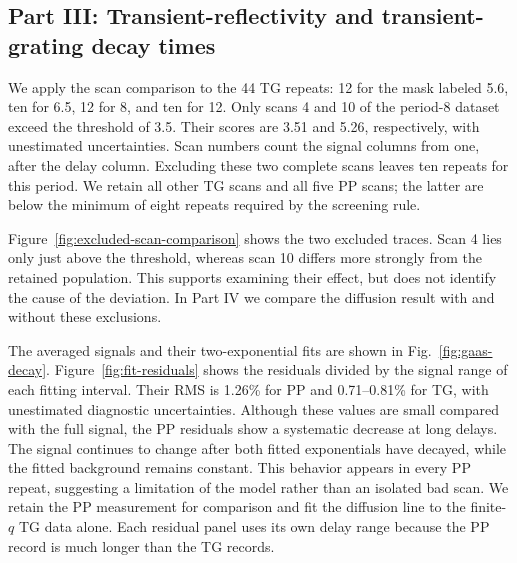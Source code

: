 \documentclass[11pt,a4paper]{article}
\begin{document}
\subsection{Part III: Transient-reflectivity and transient-grating decay times}\label{sec:decay-results}
We apply the scan comparison to the 44 TG repeats: 12 for the mask labeled 5.6, ten for 6.5, 12 for 8, and ten for 12. Only scans 4 and 10 of the period-8 dataset exceed the threshold of 3.5. Their scores are 3.51 and 5.26, respectively, with unestimated uncertainties. Scan numbers count the signal columns from one, after the delay column. Excluding these two complete scans leaves ten repeats for this period. We retain all other TG scans and all five PP scans; the latter are below the minimum of eight repeats required by the screening rule.

Figure~\ref{fig:excluded-scan-comparison} shows the two excluded traces. Scan 4 lies only just above the threshold, whereas scan 10 differs more strongly from the retained population. This supports examining their effect, but does not identify the cause of the deviation. In Part IV we compare the diffusion result with and without these exclusions.

The averaged signals and their two-exponential fits are shown in Fig.~\ref{fig:gaas-decay}. Figure~\ref{fig:fit-residuals} shows the residuals divided by the signal range of each fitting interval. Their RMS is 1.26\% for PP and 0.71--0.81\% for TG, with unestimated diagnostic uncertainties. Although these values are small compared with the full signal, the PP residuals show a systematic decrease at long delays. The signal continues to change after both fitted exponentials have decayed, while the fitted background remains constant. This behavior appears in every PP repeat, suggesting a limitation of the model rather than an isolated bad scan. We retain the PP measurement for comparison and fit the diffusion line to the finite-$q$ TG data alone. Each residual panel uses its own delay range because the PP record is much longer than the TG records.
\end{document}
